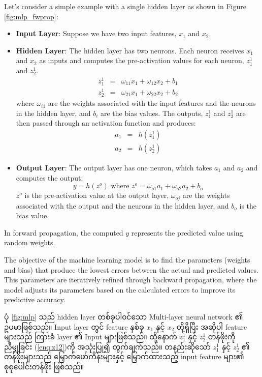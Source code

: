 \noindent Let's consider a simple example with a single hidden layer as shown in Figure \ref{fig:mlp_fwprop}:
\begin{itemize}
  \item \textbf{Input Layer}: Suppose we have two input features, $x_1$ and $x_2$.
  \item \textbf{Hidden Layer}: The hidden layer has two neurons. Each neuron receives $x_1$ and $x_2$ as inputs and computes the pre-activation values for each neuron, $z^1_1$ and $z^1_2$. 
  \begin{eqnarray}\label{enq:z12} 
    z^1_1  &=& \omega_{11} x_1 + \omega_{12}x_2 + b_1 \\
    z^1_2 &=& \omega_{21} x_1 + \omega_{22}x_2 + b_2
  \end{eqnarray} where $\omega_{i1}$ are the weights associated with the input features and the neurons in the hidden layer, and $b_i$ are the bias values.
  The outputs, $z^1_1$ and $z^1_2$ are then passed through an activation function and produces: 
  \begin{eqnarray}\label{enq:a12} 
    a_1 &=& h(z^1_1)\\
    a_2 &=& h(z^1_2)
  \end{eqnarray}  

  \item \textbf{Output Layer}: The output layer has one neuron, which takes $a_1$ and $a_2$ and computes the output:
    \begin{equation} \label{enq:Poutput} 
     y  = h (z^o) \text{ where } z^o = \omega_{o1} a_1 + \omega_{o2} a_2 + b_o
    \end{equation} $z^o$  is the pre-activation value at the output layer, $\omega_{oj}$ are the weights associated with the output and the neurons in the hidden layer, and $b_o$ is the bias value.
\end{itemize}

In forward propagation, the computed $y$ represents the predicted value using random weights. 

The objective of the machine learning model is to find the parameters (weights and bias) that produce the lowest errors between the actual and predicted values. This parameters are iteratively refined through backward propagation, where the model adjusts its parameters based on the calculated errors to improve its predictive accuracy. 

\noindent ပုံ \ref{fig:mlp} သည် hidden layer တစ်ခုပါ၀င်သော Multi-layer neural network ၏ ဥပမာဖြစ်သည်။  Input layer တွင် feature နှစ်ခု $x_1$ နှင့် $x_2$ တို့ရှိပြီး အဆိုပါ feature များသည် ကြားခံ layer ၏ Input များဖြစ်သည်။  ထို့နောက် $z^1_1$ နှင့် $z^1_2$ တန်ဖိုးကို ညီမျှခြင်း (\ref{enq:z12})ကို အသုံးပြု၍ တွက်ချက်သည်။ တနည်းဆိုသော် $z^1_1$ နှင့် $z^1_2$ ၏ တန်ဖိုးများသည် မြှောက်ဖော်ကိန်းများနှင့် မြှောက်ထားသည့် input feature များ၏ စုစုပေါင်းတန်ဖိုး ဖြစ်သည်။ 


